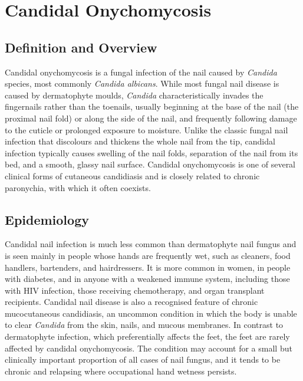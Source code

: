 \chapter{Candidal Onychomycosis}

\section*{Definition and Overview}
Candidal onychomycosis is a fungal infection of the nail caused by \textit{Candida} species, most commonly \textit{Candida albicans}. While most fungal nail disease is caused by dermatophyte moulds, \textit{Candida} characteristically invades the fingernails rather than the toenails, usually beginning at the base of the nail (the proximal nail fold) or along the side of the nail, and frequently following damage to the cuticle or prolonged exposure to moisture. Unlike the classic fungal nail infection that discolours and thickens the whole nail from the tip, candidal infection typically causes swelling of the nail folds, separation of the nail from its bed, and a smooth, glassy nail surface. Candidal onychomycosis is one of several clinical forms of cutaneous candidiasis and is closely related to chronic paronychia, with which it often coexists.

\section*{Epidemiology}
Candidal nail infection is much less common than dermatophyte nail fungus and is seen mainly in people whose hands are frequently wet, such as cleaners, food handlers, bartenders, and hairdressers. It is more common in women, in people with diabetes, and in anyone with a weakened immune system, including those with HIV infection, those receiving chemotherapy, and organ transplant recipients. Candidal nail disease is also a recognised feature of chronic mucocutaneous candidiasis, an uncommon condition in which the body is unable to clear \textit{Candida} from the skin, nails, and mucous membranes. In contrast to dermatophyte infection, which preferentially affects the feet, the feet are rarely affected by candidal onychomycosis. The condition may account for a small but clinically important proportion of all cases of nail fungus, and it tends to be chronic and relapsing where occupational hand wetness persists.

